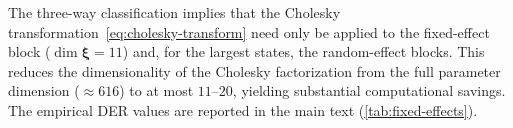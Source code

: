 
\begin{remark}
\label{smc:rem-computational-savings}
  The three-way classification implies that the Cholesky
  transformation~\eqref{eq:cholesky-transform} need only be applied
  to the fixed-effect block ($\dim\boldsymbol{\xi} = 11$) and, for
  the largest states, the random-effect blocks.  This reduces the
  dimensionality of the Cholesky factorization from the full parameter
  dimension ($\approx\!616$) to at most $11$--$20$, yielding
  substantial computational savings.  The empirical DER values are
  reported in the main text (\cref{tab:fixed-effects}).
\end{remark}
